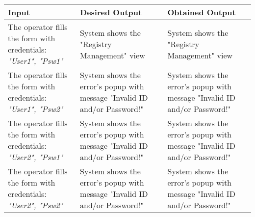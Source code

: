 {{{			\begin{table}[h]
			\begin{tabular}{|p{4cm}|p{5cm}|p{5cm}|}
			\hline
			\centering \vspace{1mm} \bfseries{Input} \vspace{1mm} & \vspace{1mm} \bfseries{Desired Output} \vspace{1mm} & \vspace{1mm} \bfseries{Obtained Output} \vspace{1mm}\\
			\hline
				\vspace{1mm} The operator fills the form with credentials: \itshape{"User1", "Psw1"} \vspace{1mm} &
				\vspace{1mm} System shows the "Registry Management" view \vspace{1mm} & 
				\vspace{1mm} System shows the "Registry Management" view \vspace{1mm} \\
			\hline
				\vspace{1mm} The operator fills the form with credentials: \itshape{"User1", "Psw2"} \vspace{1mm} &
				\vspace{1mm} System shows the error's popup with message "Invalid ID and/or Password!" \vspace{1mm} & 
				\vspace{1mm} System shows the error's popup with message "Invalid ID and/or Password!" \vspace{1mm} \\
			\hline
				\vspace{1mm} The operator fills the form with credentials: \itshape{"User2", "Psw1"} \vspace{1mm} &
				\vspace{1mm} System shows the error's popup with message "Invalid ID and/or Password!" \vspace{1mm} & 
				\vspace{1mm} System shows the error's popup with message "Invalid ID and/or Password!" \vspace{1mm} \\
			\hline
				\vspace{1mm} The operator fills the form with credentials: \itshape{"User2", "Psw2"} \vspace{1mm} &
				\vspace{1mm} System shows the error's popup with message "Invalid ID and/or Password!" \vspace{1mm} & 
				\vspace{1mm} System shows the error's popup with message "Invalid ID and/or Password!" \vspace{1mm} \\
			\hline
			\end{tabular}
			\end{table}
		}
		\clearpage

}}
